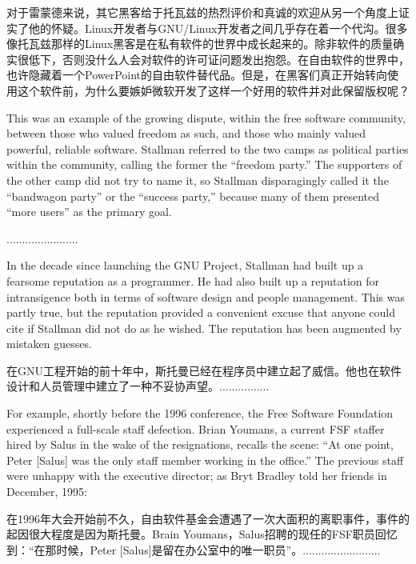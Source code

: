 \ifdefined\chs
对于雷蒙德来说，其它黑客给于托瓦兹的热烈评价和真诚的欢迎从另一个角度上证实了他的怀疑。Linux开发者与GNU/Linux开发者之间几乎存在着一个代沟。很多像托瓦兹那样的Linux黑客是在私有软件的世界中成长起来的。除非软件的质量确实很低下，否则没什么人会对软件的许可证问题发出抱怨。在自由软件的世界中，也许隐藏着一个PowerPoint的自由软件替代品。但是，在黑客们真正开始转向使用这个软件前，为什么要嫉妒微软开发了这样一个好用的软件并对此保留版权呢？
\fi

\ifdefined\eng
This was an example of the growing dispute, within the free software community, between those who valued freedom as such, and those who mainly valued powerful, reliable software.  Stallman referred to the two camps as political parties within the community, calling the former the ``freedom party.''  The supporters of the other camp did not try to name it, so Stallman disparagingly called it the ``bandwagon party'' or the ``success party,'' because many of them presented ``more
users'' as the primary goal.
\fi

\ifdefined\chs
.......................
\fi

\ifdefined\eng
In the decade since launching the GNU Project, Stallman had built up a fearsome reputation as a programmer. He had also built up a reputation for intransigence both in terms of software design and people management. This was partly true, but the reputation provided a convenient excuse that anyone could cite if Stallman did not do as he wished.  The reputation has been augmented by mistaken guesses.
\fi

\ifdefined\chs
在GNU工程开始的前十年中，斯托曼已经在程序员中建立起了威信。他也在软件设计和人员管理中建立了一种不妥协声望。................
\fi

\ifdefined\eng
For example, shortly before the 1996 conference, the Free Software Foundation experienced a full-scale staff defection.  Brian Youmans, a current FSF staffer hired by Salus in the wake of the resignations, recalls the scene: ``At one point, Peter [Salus] was the only staff member working in the office.''  The previous staff were unhappy with the executive director; as Bryt Bradley told her friends in December, 1995:
\fi

\ifdefined\chs
在1996年大会开始前不久，自由软件基金会遭遇了一次大面积的离职事件，事件的起因很大程度是因为斯托曼。Brain Youmans，Salus招聘的现任的FSF职员回忆到：“在那时候，Peter [Salus]是留在办公室中的唯一职员”。.........................
\fi

